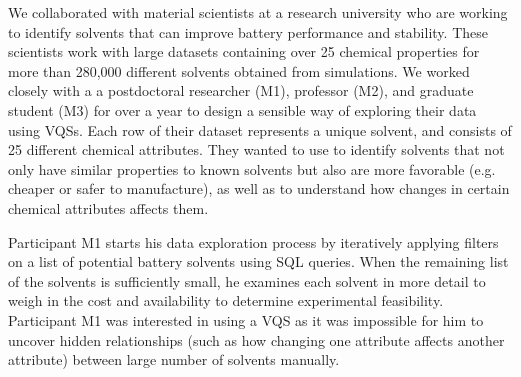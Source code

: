 \par\noindent{} We collaborated with material scientists at a research university who are working to identify solvents that can improve battery performance and stability. These scientists work with large datasets containing over 25 chemical properties for more than 280,000 different solvents obtained from simulations. We worked closely with a a postdoctoral researcher (M1), professor (M2), and graduate student (M3) for over a year to design a sensible way of exploring their data using VQSs. Each row of their dataset represents a unique solvent, and consists of 25 different chemical attributes. They wanted to use \zv to identify solvents that not only have similar properties to known solvents but also are more favorable (e.g. cheaper or safer to manufacture), as well as to understand how changes in certain chemical attributes affects them.
\par Participant M1 starts his data exploration process by iteratively applying filters on a list of potential battery solvents using SQL queries. When the remaining list of the solvents is sufficiently small, he examines each solvent in more detail to weigh in the cost and availability to determine experimental feasibility. Participant M1 was interested in using a VQS as it was impossible for him to uncover hidden relationships (such as how changing one attribute affects another attribute) between large number of solvents manually.
